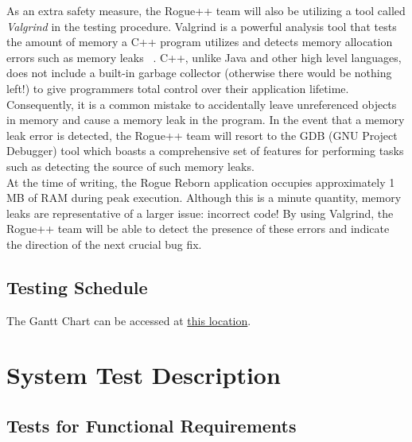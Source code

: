 \documentclass[12pt, titlepage]{article}
\newcommand{\rev}[1]{\textcolor{RevisionColour}{#1}}
\begin{document}
	\bigskip

	As an extra safety measure, the Rogue++ team will also be utilizing a tool called \textit{Valgrind} in the testing procedure.  Valgrind is a powerful analysis tool that tests the amount of memory a C++ program utilizes and detects memory allocation errors such as memory leaks ~\citep{ValgrindHome}.  C++, unlike Java and other high level languages, does not include a built-in garbage collector (otherwise there would be nothing left!) to give programmers total control over their application lifetime.  Consequently, it is a common mistake to accidentally leave unreferenced objects in memory and cause a memory leak in the program.  \rev{In the event that a memory leak error is detected, the Rogue++ team will resort to the GDB (GNU Project Debugger) tool which boasts a comprehensive set of features for performing tasks such as detecting the source of such memory leaks.  ~\citep{GDBHome}}\\

	At the time of writing, the Rogue Reborn application occupies approximately 1 MB of RAM during peak execution.  Although this is a minute quantity, memory leaks are representative of a larger issue: incorrect code!  By using Valgrind, the Rogue++ team will be able to detect the presence of these errors and indicate the direction of the next crucial bug fix.

	\subsection{Testing Schedule}
		
	The Gantt Chart can be accessed at \href{run:../../ProjectSchedule/Rogue.gan}{this location}.

\newpage
\section{System Test Description}
\label{section3}
	
	\subsection{Tests for Functional Requirements}

\end{document}
